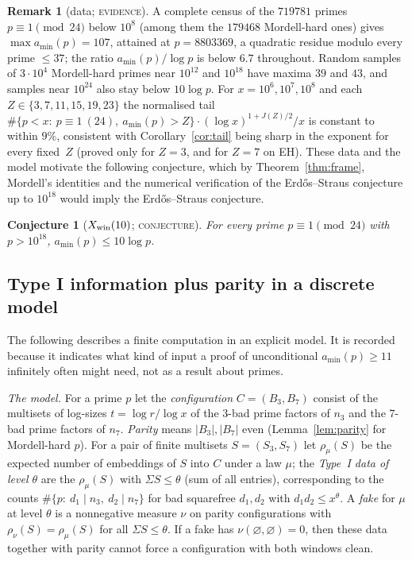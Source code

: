\documentclass[11pt,reqno]{amsart}
\newtheorem{conjecture}[theorem]{Conjecture}
\theoremstyle{definition}
\newtheorem{remark}[theorem]{Remark}
\newcommand{\amin}{a_{\min}}
\newcommand{\status}[1]{\textup{\textsc{#1}}}
\begin{document}
\begin{remark}[data; \status{evidence}]\label{rem:data}
A complete census of the $719781$ primes $p\equiv1\pmod{24}$ below $10^8$
(among them the $179468$ Mordell-hard ones) gives $\max\amin(p)=107$, attained at
$p=8803369$, a quadratic residue modulo every prime $\le37$; the ratio
$\amin(p)/\log p$ is below $6.7$ throughout.  Random samples of $3\cdot10^4$
Mordell-hard primes near $10^{12}$ and $10^{18}$ have maxima $39$ and $43$,
and samples near $10^{24}$ also stay below $10\log p$.  For
$x=10^6,10^7,10^8$ and each $Z\in\{3,7,11,15,19,23\}$ the normalised tail
$\#\{p<x:\ p\equiv1\ (24),\ \amin(p)>Z\}\cdot(\log x)^{1+J(Z)/2}/x$ is
constant to within $9\%$, consistent with Corollary~\ref{cor:tail} being
sharp in the exponent for every fixed~$Z$ (proved only for $Z=3$, and for
$Z=7$ on EH).  These data and the model motivate the following
conjecture, which by Theorem~\ref{thm:frame}, Mordell's identities and the
numerical verification of the Erd\H{o}s--Straus conjecture up to
$10^{18}$ \cite{MD} would imply the Erd\H{o}s--Straus conjecture.
\end{remark}

\begin{conjecture}[$X_{\rm win}(10)$; \status{conjecture}]
For every prime $p\equiv1\pmod{24}$ with $p>10^{18}$, $\amin(p)\le10\log p$.
\end{conjecture}

\subsection{Type I information plus parity in a discrete model}

The following describes a finite computation in an explicit model.  It
is recorded because it indicates what kind of input a proof of
unconditional $\amin(p)\ge11$ infinitely often might need, not as a
result about primes.

\emph{The model.}  For a prime $p$ let the \emph{configuration}
$C=(B_3,B_7)$ consist of the multisets of log-sizes $t=\log r/\log x$ of
the $3$-bad prime factors of $n_3$ and the $7$-bad prime factors of $n_7$.
\emph{Parity} means $|B_3|,|B_7|$ even (Lemma~\ref{lem:parity} for
Mordell-hard $p$).  For a pair of finite multisets $S=(S_3,S_7)$ let
$\rho_\mu(S)$ be the expected number of embeddings of $S$ into $C$ under a
law $\mu$; the \emph{Type~I data of level $\theta$} are the $\rho_\mu(S)$
with $\Sigma S\le\theta$ (sum of all entries), corresponding to the counts
$\#\{p:\ d_1\mid n_3,\ d_2\mid n_7\}$ for bad squarefree $d_1,d_2$ with
$d_1d_2\le x^\theta$.  A \emph{fake} for $\mu$ at level $\theta$ is a nonnegative
measure $\nu$ on parity configurations with $\rho_\nu(S)=\rho_\mu(S)$ for
all $\Sigma S\le\theta$.  If a fake has $\nu(\varnothing,\varnothing)=0$,
then these data together with parity cannot force a configuration with
both windows clean.
\end{document}

